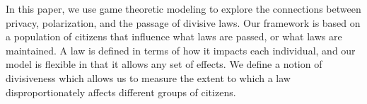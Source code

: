 %
In this paper, we use game theoretic modeling to explore the connections between privacy, polarization, and the passage of divisive laws.  Our framework is based on a population of citizens that influence what laws are passed, or what laws are maintained.  A law is defined in terms of how it impacts each individual, and our model is flexible in that it allows any set of effects.  We define a notion of divisiveness which allows us to measure the extent to which a law disproportionately affects different groups of citizens.
